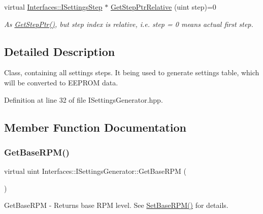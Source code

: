 \begin{DoxyCompactItemize}
virtual \hyperlink{class_interfaces_1_1_i_settings_step}{Interfaces\+::\+I\+Settings\+Step} $\ast$ \hyperlink{class_interfaces_1_1_i_settings_generator_a8de5944be5295009b7407772bc9b1b3b}{Get\+Step\+Ptr\+Relative} (uint step)=0
\begin{DoxyCompactList}\small\item\em As \hyperlink{class_interfaces_1_1_i_settings_generator_af1b65a18c3ade3235715ae2e9cdbcfe0}{Get\+Step\+Ptr()}, but step index is relative, i.\+e. step = 0 means actual first step. \end{DoxyCompactList}\end{DoxyCompactItemize}


\subsection{Detailed Description}
Class, containing all settings steps. It being used to generate settings table, which will be converted to E\+E\+P\+R\+OM data. 

Definition at line 32 of file I\+Settings\+Generator.\+hpp.



\subsection{Member Function Documentation}
\mbox{\label{class_interfaces_1_1_i_settings_generator_ad088253da57b2ee0b94fe6fd1fb2dfdd}} 
\subsubsection{\texorpdfstring{Get\+Base\+R\+P\+M()}{GetBaseRPM()}}
{\footnotesize\ttfamily virtual uint Interfaces\+::\+I\+Settings\+Generator\+::\+Get\+Base\+R\+PM (\begin{DoxyParamCaption}{ }\end{DoxyParamCaption})\hspace{0.3cm}{\ttfamily [pure virtual]}}



Get\+Base\+R\+PM -\/ Returns base R\+PM level. See \hyperlink{class_interfaces_1_1_i_settings_generator_a4caf07447d0930440d9f21318892244c}{Set\+Base\+R\+P\+M()} for details. 

